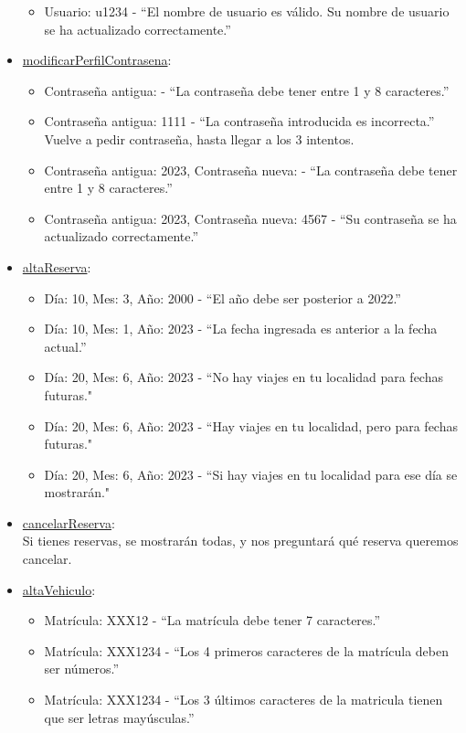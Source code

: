 \begin{itemize}
\begin{itemize}
    \item Usuario: u1234 - “El nombre de usuario es válido. Su nombre de usuario se ha actualizado correctamente.”
  \end{itemize}
  \item \href{DOC_DOXYGEN/modificar_8c_source.html}{modificarPerfilContrasena}:
  \begin{itemize}
    \item Contraseña antigua:  - “La contraseña debe tener entre 1 y 8 caracteres.”
    \item Contraseña antigua: 1111 - “La contraseña introducida es incorrecta.” Vuelve a pedir contraseña, hasta llegar a los 3 intentos.
    \item Contraseña antigua: 2023, Contraseña nueva:  - “La contraseña debe tener entre 1 y 8 caracteres.”
    \item Contraseña antigua: 2023, Contraseña nueva: 4567 - “Su contraseña se ha actualizado correctamente.”
  \end{itemize}
  \item \href{DOC_DOXYGEN/escribir_8c_source.html}{altaReserva}:
  \begin{itemize}
    \item Día: 10, Mes: 3, Año: 2000 - “El año debe ser posterior a 2022.”
    \item Día: 10, Mes: 1, Año: 2023 - “La fecha ingresada es anterior a la fecha actual.”
    \item Día: 20, Mes: 6, Año: 2023 - “No hay viajes en tu localidad para fechas futuras."
    \item Día: 20, Mes: 6, Año: 2023 - “Hay viajes en tu localidad, pero para fechas futuras."
    \item Día: 20, Mes: 6, Año: 2023 - “Si hay viajes en tu localidad para ese día se mostrarán."
  \end{itemize}
  \item \href{DOC_DOXYGEN/eliminar_8c_source.html}{cancelarReserva}:\\
    Si tienes reservas, se mostrarán todas, y nos preguntará qué reserva queremos cancelar.
  \item \href{DOC_DOXYGEN/escribir_8c_source.html}{altaVehiculo}:
  \begin{itemize}
    \item Matrícula: XXX12 - “La matrícula debe tener 7 caracteres.”
    \item Matrícula: XXX1234 - “Los 4 primeros caracteres de la matrícula deben ser números.”
    \item Matrícula: XXX1234 - “Los 3 últimos caracteres de la matricula tienen que ser letras mayúsculas.”

\end{itemize}
\end{itemize}
